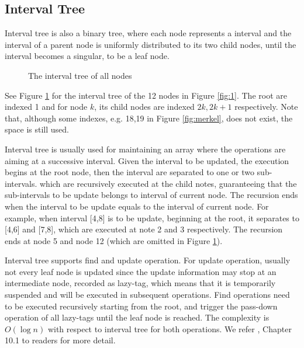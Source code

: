 \subsection{Interval Tree}
Interval tree is also a binary tree, where each node represents a interval and the interval of a parent node is uniformly distributed to its two child nodes, until the interval becomes a singular, to be a leaf node. 
\begin{figure}
	\centering
	
	\caption{The interval tree of all nodes}
				\label{fig:interval}
\end{figure}
See Figure \ref{fig:interval} for the interval tree of the 12 nodes in Figure \ref{fig:1}. The root are indexed 1 and for node $k$, its child nodes are indexed $2k,2k+1$ respectively. Note that, although some indexes, e.g. 18,19 in Figure \ref{fig:merkel}, does not exist, the space is still used. 

Interval tree is usually used for maintaining an array where the operations are aiming at a successive interval. Given the interval to be updated, the execution begins at the root node, then the interval are separated to one or two sub-intervals. which are recursively executed at the child notes, guaranteeing that the sub-intervals to be update belongs to interval of current node. The recursion ends when the interval to be update equals to the interval of current node. For example, when interval 
[4,8] is to be update, beginning at the root, it separates to [4,6] and [7,8], which are executed at note 2 and 3 respectively. The recursion ends at node 5 and node 12 (which are omitted in Figure \ref{fig:interval}).

Interval tree supports find and update operation. For update operation, usually not every leaf node is updated since the update information may stop at an intermediate node, recorded as lazy-tag, which means that it is temporarily suspended and will be executed in subsequent operations. Find operations need to be executed recursively starting from the root, and trigger the pass-down operation of all lazy-tags until the leaf node is reached. The complexity is $O(\log n)$ with respect to interval tree for both operations. We refer \cite{mulmuley1994computational}, Chapter 10.1 to readers for more detail.


